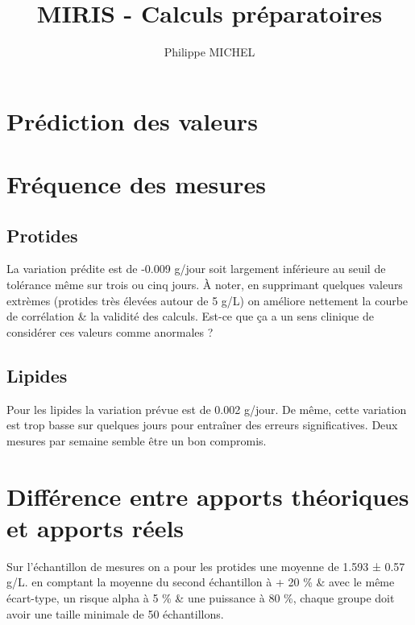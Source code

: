 \documentclass[]{tufte-handout}
\title{MIRIS - Calculs préparatoires}
\author{Philippe MICHEL}
\date{}
\begin{document}
\maketitle




\hypertarget{prediction-des-valeurs}{%
\section{Prédiction des valeurs}\label{prediction-des-valeurs}}

\hypertarget{frequence-des-mesures}{%
\section{Fréquence des mesures}\label{frequence-des-mesures}}

\hypertarget{protides}{%
\subsection{Protides}\label{protides}}

La variation prédite est de -0.009 g/jour soit largement inférieure au
seuil de tolérance même sur trois ou cinq jours. À noter, en supprimant
quelques valeurs extrèmes (protides très élevées autour de 5 g/L) on
améliore nettement la courbe de corrélation \& la validité des calculs.
Est-ce que ça a un sens clinique de considérer ces valeurs comme
anormales ?

\hypertarget{lipides}{%
\subsection{Lipides}\label{lipides}}

Pour les lipides la variation prévue est de 0.002 g/jour. De même, cette
variation est trop basse sur quelques jours pour entraîner des erreurs
significatives. Deux mesures par semaine semble être un bon compromis.

\hypertarget{difference-entre-apports-theoriques-et-apports-reels}{%
\section{Différence entre apports théoriques et apports
réels}\label{difference-entre-apports-theoriques-et-apports-reels}}

Sur l'échantillon de mesures on a pour les protides une moyenne de 1.593
± 0.57 g/L. en comptant la moyenne du second échantillon à + 20 \% \&
avec le même écart-type, un risque alpha à 5 \% \& une puissance à 80
\%, chaque groupe doit avoir une taille minimale de 50 échantillons.
\end{document}
